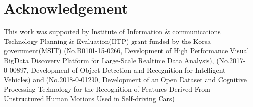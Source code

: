 \documentclass[sigconf]{acmart}
\begin{document}
\section*{Acknowledgement}

This work was supported by Institute of Information \& communications Technology Planning \& Evaluation(IITP) grant funded by the Korea government(MSIT) (No.B0101-15-0266, Development of High Performance Visual BigData Discovery Platform for Large-Scale Realtime Data Analysis), (No.2017-0-00897, Development of Object Detection and Recognition for Intelligent Vehicles) and (No.2018-0-01290, Development of an Open Dataset and Cognitive Processing Technology for the Recognition of Features Derived From Unstructured Human Motions Used in Self-driving Cars)


\balance

\end{document}
